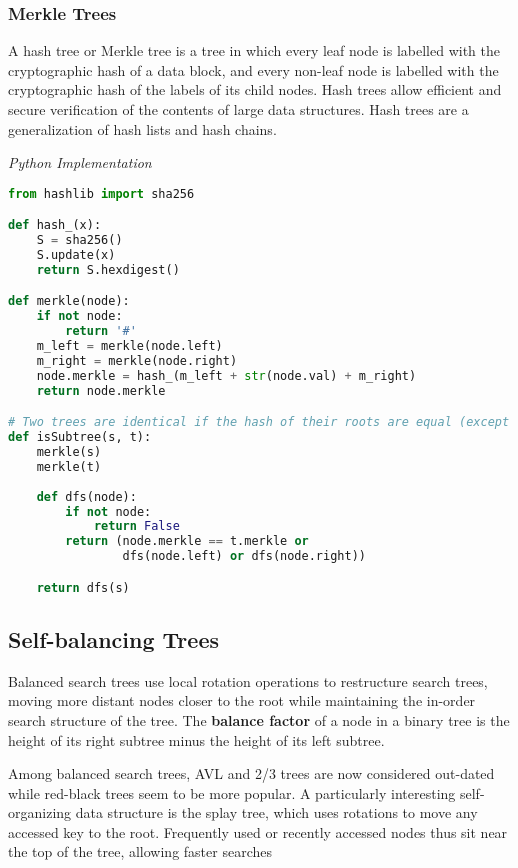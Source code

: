 \documentclass{article}
\begin{document}
    \subsubsection{Merkle Trees}
    A hash tree or Merkle tree is a tree in which every leaf node is labelled with the cryptographic hash of a data block, and every non-leaf node is labelled with the cryptographic hash of the labels of its child nodes. Hash trees allow efficient and secure verification of the contents of large data structures. Hash trees are a generalization of hash lists and hash chains.
    
\vspace{8pt} \emph{Python Implementation}
\begin{lstlisting}[language=Python]
from hashlib import sha256

def hash_(x):
    S = sha256()
    S.update(x)
    return S.hexdigest()

def merkle(node):
    if not node:
        return '#'
    m_left = merkle(node.left)
    m_right = merkle(node.right)
    node.merkle = hash_(m_left + str(node.val) + m_right)
    return node.merkle

# Two trees are identical if the hash of their roots are equal (except for collisions)
def isSubtree(s, t):
    merkle(s)
    merkle(t)
    
    def dfs(node):
        if not node:
            return False
        return (node.merkle == t.merkle or
                dfs(node.left) or dfs(node.right))

    return dfs(s)
\end{lstlisting}

    \subsection{Self-balancing Trees}
    Balanced search trees use local rotation operations to restructure search trees, moving more distant nodes closer to the root while maintaining the in-order search structure of the tree. The \textbf{balance factor} of a node in a binary tree is the height of its right subtree minus the height of its left subtree. 
    
    Among balanced search trees, AVL and 2/3 trees are now considered out-dated while red-black trees seem to be more popular. A particularly interesting self-organizing data structure is the splay tree, which uses rotations to move any accessed key to the root. Frequently used or recently accessed nodes thus sit near the top of the tree, allowing faster searches 
    
\end{document}
